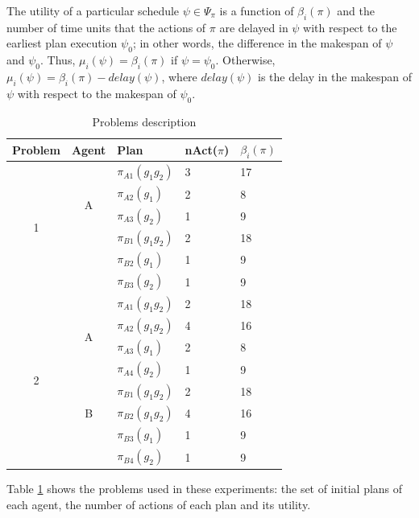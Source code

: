 \documentclass[letterpaper]{article}
\begin{document}
The utility of a particular schedule $\psi \in \Psi_{\pi}$ is a function of $\beta_i(\pi)$ and the number of time units that the actions of $\pi$ are delayed in $\psi$ with respect to the earliest plan execution $\psi_0$; in other words, the difference in the makespan of $\psi$ and $\psi_0$. Thus, $\mu_i(\psi)=\beta_i(\pi)$ if $\psi = \psi_0$. Otherwise, $\mu_i(\psi)=\beta_i(\pi)- delay(\psi)$, where $delay(\psi)$ is the delay in the makespan of $\psi$ with respect to the makespan of $\psi_0$.


\begin{table}[ht]
\centering \footnotesize
\begin{tabular}{|c|c|l|l|l|}
\hline
Problem & Agent  & Plan & nAct($\pi$) & $\beta_i(\pi)$ \\ \hline

\multirow{6}{*}{1} & \multirow{4}{*}{A} &  $\pi_{A1}(g_1g_2)$ & 3 &  17  \\
& &   $\pi_{A2}(g_1)$ & 2 & 8 \\
& &   $\pi_{A3}(g_2)$ & 1 & 9 \\  \cline{2-5}
& \multirow{3}{*}{B} &  $\pi_{B1}(g_1g_2)$ & 2 &  18  \\
& &  $\pi_{B2}(g_1)$ & 1 & 9 \\
& & $\pi_{B3}(g_2)$ & 1 & 9 \\

\hline \hline

\multirow{8}{*}{2} & \multirow{4}{*}{A} &  $\pi_{A1}(g_1g_2)$ & 2 &  18  \\
& &  $\pi_{A2}(g_1g_2)$ & 4 & 16 \\
& &   $\pi_{A3}(g_1)$ & 2 & 8 \\
& &   $\pi_{A4}(g_2)$ & 1 & 9 \\  \cline{2-5}
& \multirow{3}{*}{B} &  $\pi_{B1}(g_1g_2)$ & 2 &  18  \\
& &  $\pi_{B2}(g_1g_2)$ & 4 & 16 \\
& &  $\pi_{B3}(g_1)$ & 1 & 9 \\
& & $\pi_{B4}(g_2)$ & 1 & 9 \\ \hline

\end{tabular}
\caption{Problems description}
\label{tab:setup}
\end{table}

Table \ref{tab:setup} shows the problems used in these experiments: the set of initial plans of each agent, the number of actions of each plan and its utility.
\end{document}
